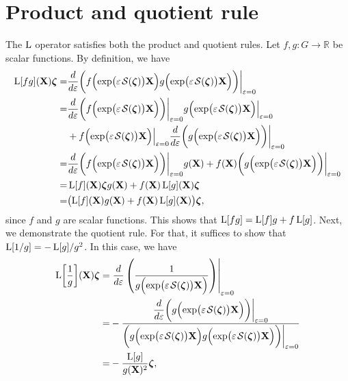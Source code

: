 \section{Product and quotient rule}\label{sec:appendix-prop-Lop-product-quotient}
The $\operatorname{L}$ operator satisfies both the product and quotient rules. Let $f,g:G\to \mathbb{R}$ be scalar functions. By definition, we have
\begin{align}
  \begin{split}
      \Lop[fg](\mathbf{X})\boldsymbol{\zeta} =&
      \frac{d}{d\varepsilon}\biggl(f\Bigl(\exp\bigl(\varepsilon\SL[\boldsymbol{\zeta}]\bigr)\mathbf{X}\Bigr)g\Bigl(\exp\bigl(\varepsilon\SL[\boldsymbol{\zeta}]\bigr)\mathbf{X}\Bigr)\biggr)\biggr|_{\varepsilon=0}\\
      =& \frac{d}{d\varepsilon}\biggl(f\Bigl(\exp\bigl(\varepsilon\SL[\boldsymbol{\zeta}]\bigr)\mathbf{X}\Bigr)\biggr)\biggr|_{\varepsilon=0}g\Bigl(\exp\bigl(\varepsilon\SL[\boldsymbol{\zeta}]\bigr)\mathbf{X}\Bigr)\Bigr|_{\varepsilon=0}
      \\ &+ f\Bigl(\exp\bigl(\varepsilon\SL[\boldsymbol{\zeta}]\bigr)\mathbf{X}\Bigr)\Bigr|_{\varepsilon=0}\frac{d}{d\varepsilon}\biggl(g\Bigl(\exp\bigl(\varepsilon\SL[\boldsymbol{\zeta}]\bigr)\mathbf{X}\Bigr)\biggr)\biggr|_{\varepsilon=0}
      \\
      =& \frac{d}{d\varepsilon}\biggl(f\Bigl(\exp\bigl(\varepsilon\SL[\boldsymbol{\zeta}]\bigr)\mathbf{X}\Bigr)\biggr)\biggr|_{\varepsilon=0}g(\mathbf{X})
      + f(\mathbf{X})\biggl(g\Bigl(\exp\bigl(\varepsilon\SL[\boldsymbol{\zeta}]\bigr)\mathbf{X}\Bigr)\biggr)\biggr|_{\varepsilon=0}\\
      =& \Lop[f](\mathbf{X})\boldsymbol{\zeta}g(\mathbf{X}) + f(\mathbf{X})\Lop[g](\mathbf{X})\boldsymbol{\zeta}\\
        =& \bigl(\Lop[f](\mathbf{X})g(\mathbf{X}) + f(\mathbf{X})\Lop[g](\mathbf{X})\bigr)\boldsymbol{\zeta},
  \end{split}
\end{align}
since $f$ and $g$ are scalar functions. This shows that $\operatorname{L}[fg] = \operatorname{L}[f]g + f\operatorname{L}[g]$. Next, we demonstrate the quotient rule. For that, it suffices to show that $\operatorname{L}[1/g] = -\operatorname{L}[g]/g^2$. In this case, we have
\begin{align}
    \begin{split}
        \Lop\biggl[\frac{1}{g}\biggr](\mathbf{X})\boldsymbol{\zeta} =& \left.\frac{d}{d\varepsilon}\left(\frac{1}{g\Bigl(\exp\bigl(\varepsilon\SL[\boldsymbol{\zeta}]\bigr)\mathbf{X}\Bigr)}\right)\right|_{\varepsilon=0}\\
        =& -\frac{{\displaystyle\frac{d}{d\varepsilon}}\biggl(g\Bigl(\exp\bigl(\varepsilon\SL[\boldsymbol{\zeta}]\bigr)\mathbf{X}\Bigr)\biggr)\biggr|_{\varepsilon=0}}{\biggl(g\Bigl(\exp\bigl(\varepsilon\SL[\boldsymbol{\zeta}]\bigr)\mathbf{X}\Bigr)g\Bigl(\exp\bigl(\varepsilon\SL[\boldsymbol{\zeta}]\bigr)\mathbf{X}\Bigr)\biggr)\biggr|_{\varepsilon=0}}\\
        =& -\frac{\Lop[g]}{g(\mathbf{X})^2}\boldsymbol{\zeta},
    \end{split}
\end{align}
